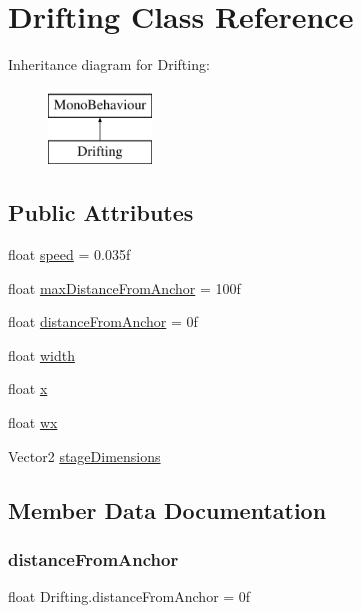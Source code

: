 \hypertarget{classDrifting}{}\section{Drifting Class Reference}
\label{classDrifting}
Inheritance diagram for Drifting\+:\begin{figure}[H]
\begin{center}
\leavevmode
\includegraphics[height=2.000000cm]{classDrifting}
\end{center}
\end{figure}
\subsection*{Public Attributes}
\begin{DoxyCompactItemize}
\item 
float \hyperlink{classDrifting_a0c5dd71ce91b249e6e4db0bb77d30047}{speed} = 0.\+035f
\item 
float \hyperlink{classDrifting_a047eded1a291cef9fc36352f5dbab181}{max\+Distance\+From\+Anchor} = 100f
\item 
float \hyperlink{classDrifting_a5b6afc429a8f0d85aaecefdd25fdfdee}{distance\+From\+Anchor} = 0f
\item 
float \hyperlink{classDrifting_a4e356ca8b5f444781f033d7115d50259}{width}
\item 
float \hyperlink{classDrifting_a27b6a1856b5db697632db9b4b82ef091}{x}
\item 
float \hyperlink{classDrifting_ae72ad1d5041e8e81660fe932528db0f3}{wx}
\item 
Vector2 \hyperlink{classDrifting_a38cee05085af8f9f285a7046bcfe324b}{stage\+Dimensions}
\end{DoxyCompactItemize}


\subsection{Member Data Documentation}
\mbox{\label{classDrifting_a5b6afc429a8f0d85aaecefdd25fdfdee}} 
\subsubsection{\texorpdfstring{distance\+From\+Anchor}{distanceFromAnchor}}
{\footnotesize\ttfamily float Drifting.\+distance\+From\+Anchor = 0f}

